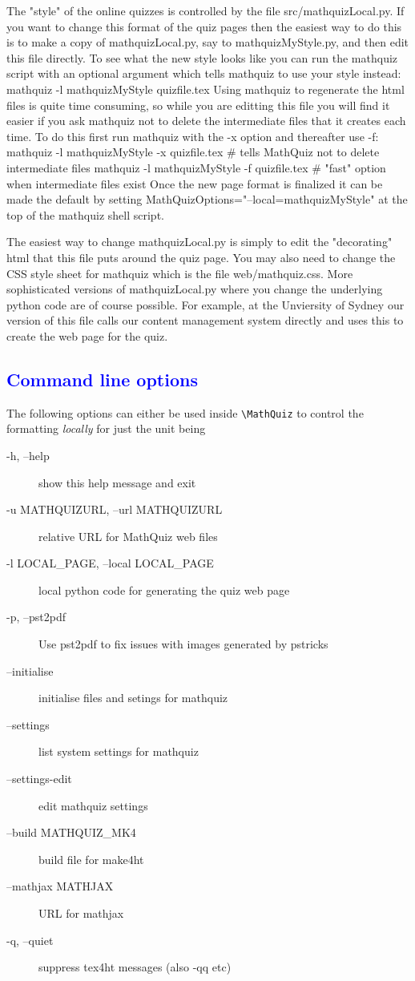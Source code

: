 \documentclass[svgnames]{article}
\newcommand\Section[1]{\subsection{\textcolor{blue}{#1}}}
\def\MathQuiz{\textcolor{blue}{\textsc{MathQuiz}}\xspace}
\begin{document}
The "style" of the online quizzes is controlled by the file src/mathquizLocal.py. If you want to
change this format of the quiz pages then the easiest way to do this is to make a copy of
mathquizLocal.py, say to mathquizMyStyle.py, and then edit this file directly. To see what the
new style looks like you can run the mathquiz script with an optional argument which tells
mathquiz to use your style instead:
    mathquiz -l mathquizMyStyle quizfile.tex
Using mathquiz to regenerate the html files is quite time consuming, so while you are editting this
file you will find it easier if you ask mathquiz not to delete the intermediate files that it
creates each time. To do this first run mathquiz with the -x option and thereafter use -f:
    mathquiz -l mathquizMyStyle -x quizfile.tex   \# tells MathQuiz not to delete intermediate files
    mathquiz -l mathquizMyStyle -f quizfile.tex   \# "fast" option when intermediate files exist
Once the new page format is finalized it can be made the default by setting
    MathQuizOptions="--local=mathquizMyStyle"
at the top of the mathquiz shell script.

The easiest way to change mathquizLocal.py is simply to edit the "decorating" html that this file puts
around the quiz page. You may also need to change the CSS style sheet for mathquiz which is the file
web/mathquiz.css. More sophisticated versions of mathquizLocal.py where you change the underlying
python code are of course possible. For example, at the Unviersity of Sydney our version of this file
calls our content management system directly and uses this to create the web page for the quiz.

    \Section{Command line options}

    The following options can either be used inside \Verb|\MathQuiz| to
    control the formatting \textit{locally} for just the unit being


    \begin{description}
       \item[ -h, --help]            show this help message and exit
       \item[-u MATHQUIZURL, --url MATHQUIZURL]
                    relative URL for MathQuiz web files
       \item[-l LOCAL\_PAGE, --local LOCAL\_PAGE]
                    local python code for generating the quiz web page
       \item[-p, --pst2pdf]
          Use pst2pdf to fix issues with images generated by pstricks
       \item[--initialise]
          initialise files and setings for mathquiz
          \item[--settings]
          list system settings for mathquiz
          \item[--settings-edit]      edit mathquiz settings
          \item[--build MATHQUIZ\_MK4] build file for make4ht
          \item[--mathjax MATHJAX]    URL for mathjax
          \item[-q, --quiet]          suppress tex4ht messages (also -qq etc)
    \end{description}
\end{document}
